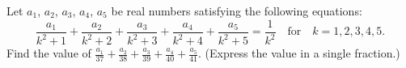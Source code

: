 Let $ a_1$, $ a_2$, $ a_3$, $ a_4$, $ a_5$ be real numbers satisfying the following equations: \[\frac{a_1}{k^2+1}+\frac{a_2}{k^2+2}+\frac{a_3}{k^2+3}+\frac{a_4}{k^2+4}+\frac{a_5}{k^2+5} = \frac{1}{k^2}\quad\text{for}\quad k = 1, 2, 3, 4, 5.\] Find the value of $ \frac{a_1}{37}+\frac{a_2}{38}+\frac{a_3}{39}+\frac{a_4}{40}+\frac{a_5}{41}$. (Express the value in a single fraction.)